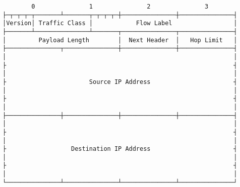 \documentclass[varwidth=25cm,crop]{standalone}
\begin{document}
\begin{verbatim}
        0               1               2               3
├─┬─┬─┬─┬───────┴───────┬─┬─┬─┬─┼───────────────┼───────────────┤
│Version│ Traffic Class │            Flow Label                 │
├───────┴───────────────┴───────┬───────────────┬───────────────┤
│         Payload Length        │  Next Header  │   Hop Limit   │
├───────────────┬───────────────┼───────────────┼───────────────┤
│                                                               │
├                                                               ┤
│                                                               │
├                       Source IP Address                       ┤
│                                                               │
├                                                               ┤
│                                                               │
├───────────────┼───────────────┼───────────────┼───────────────┤
│                                                               │
├                                                               ┤
│                                                               │
├                  Destination IP Address                       ┤
│                                                               │
├                                                               ┤
│                                                               │
└───────────────┴───────────────┴───────────────┴───────────────┘
\end{verbatim}
\end{document}
